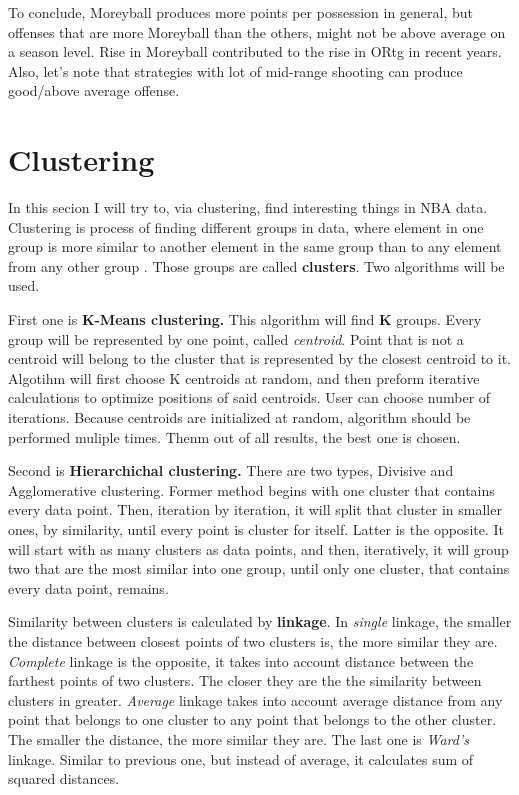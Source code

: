 \documentclass[a4paper]{article}
\begin{document}
To conclude, Moreyball produces more points per possession in general, but offenses that are more Moreyball than the others, might not be above average on a season level. Rise in Moreyball contributed to the rise in ORtg in recent years. Also, let's note that strategies with lot of mid-range shooting can produce good/above average offense. %


\section{Clustering}
\label{sec:clustering}

In this secion I will try to, via clustering, find interesting things in NBA data. Clustering is process of finding different groups in data, where element in one group is more similar to another element in the same group than to any element from any other group \cite{clustering}. Those groups are called \textbf{clusters}. Two algorithms will be used.

First one is \textbf{K-Means clustering.} This algorithm will find \textbf{K} groups. Every group will be represented by one point, called \textit{centroid}. Point that is not a centroid will belong to the cluster that is represented by the closest centroid to it. Algotihm will first choose K centroids at random, and then preform iterative calculations to optimize positions of said centroids. User can choose number of iterations. Because centroids are initialized at random, algorithm should be performed muliple times. Thenm out of all results, the best one is chosen. \cite{clustering}

Second is \textbf{Hierarchichal clustering.} There are two types, Divisive and Agglomerative clustering. Former method begins with one cluster that contains every data point. Then, iteration by iteration, it will split that cluster in smaller ones, by similarity, until every point is cluster for itself. Latter is the opposite. It will start with as many clusters as data points, and then, iteratively, it will group two that are the most similar into one group, until only one cluster, that contains every data point, remains. \cite{clustering}

Similarity between clusters is calculated by \textbf{linkage}. In \textit{single} linkage, the smaller the distance between closest points of two clusters is, the more similar they are. \textit{Complete} linkage is the opposite, it takes into account distance between the farthest points of two clusters. The closer they are the the similarity between clusters in greater. \textit{Average} linkage takes into account average distance from any point that belongs to one cluster to any point that belongs to the other cluster. The smaller the distance, the more similar they are. The last one is \textit{Ward's} linkage. Similar to previous one, but instead of average, it calculates sum of squared distances. \cite{clustering}\cite{hierarchical}
\end{document}
